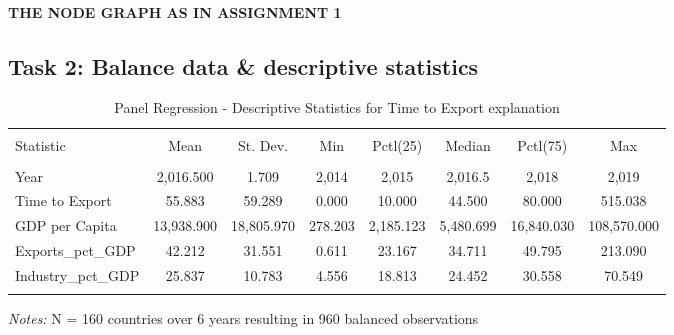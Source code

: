 \documentclass[a4paper]{article}
\begin{document}
\paragraph{THE NODE GRAPH AS IN ASSIGNMENT 1}
\begin{center}
\end{center}


\subsection{Task 2: Balance data \& descriptive statistics}

\begin{table}[!htbp] 
\begin{adjustwidth}{-0cm}{-0cm}
\begin{threeparttable}
\small
\captionsetup{font=small, justification=raggedright,singlelinecheck=false}
  \caption{Panel Regression - Descriptive Statistics for Time to Export explanation} 
  \label{} 
\begin{tabular}{@{\extracolsep{5pt}}lccccccc} 
\\[-5.8ex]\hline 
\hline \\[-1.8ex] 
Statistic & \multicolumn{1}{c}{Mean} & \multicolumn{1}{c}{St. Dev.} & \multicolumn{1}{c}{Min} & \multicolumn{1}{c}{Pctl(25)} & \multicolumn{1}{c}{Median} & \multicolumn{1}{c}{Pctl(75)} & \multicolumn{1}{c}{Max} \\ 
\hline \\[-1.8ex] 
Year & 2,016.500 & 1.709 & 2,014 & 2,015 & 2,016.5 & 2,018 & 2,019 \\ 
Time to Export & 55.883 & 59.289 & 0.000 & 10.000 & 44.500 & 80.000 & 515.038 \\ 
GDP per Capita & 13,938.900 & 18,805.970 & 278.203 & 2,185.123 & 5,480.699 & 16,840.030 & 108,570.000 \\ 
Exports\_pct\_GDP & 42.212 & 31.551 & 0.611 & 23.167 & 34.711 & 49.795 & 213.090 \\ 
Industry\_pct\_GDP & 25.837 & 10.783 & 4.556 & 18.813 & 24.452 & 30.558 & 70.549 \\ 
\hline \\
[-3.5ex] 
\end{tabular} 
\begin{tablenotes}
      \small
      \item\textit{Notes:} N = 160 countries over 6 years resulting in 960 balanced observations
    \end{tablenotes}
\end{threeparttable}
\end{adjustwidth}
\end{table}
\end{document}

